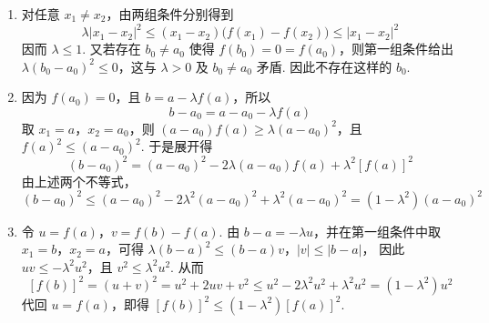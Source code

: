 \begin{solution}
\begin{enumerate}
\item 对任意 \(x_1\ne x_2\)，由两组条件分别得到
\[
\lambda|x_1-x_2|^2\leqslant (x_1-x_2)\bigl(f(x_1)-f(x_2)\bigr)\leqslant |x_1-x_2|^2
\]
因而 \(\lambda\leqslant1\). 又若存在 \(b_0\ne a_0\) 使得 \(f(b_0)=0=f(a_0)\)，则第一组条件给出 \(\lambda(b_0-a_0)^2\leqslant0\)，这与 \(\lambda>0\) 及 \(b_0\ne a_0\) 矛盾. 因此不存在这样的 \(b_0\).

\item 因为 \(f(a_0)=0\)，且 \(b=a-\lambda f(a)\)，所以
\[
b-a_0=a-a_0-\lambda f(a)
\]
取 \(x_1=a\)，\(x_2=a_0\)，则 \((a-a_0)f(a)\geqslant\lambda(a-a_0)^2\)，且 \(f(a)^2\leqslant(a-a_0)^2\). 于是展开得
\[
(b-a_0)^2=(a-a_0)^2-2\lambda(a-a_0)f(a)+\lambda^2[f(a)]^2
\]
由上述两个不等式，
\[
(b-a_0)^2\leqslant(a-a_0)^2-2\lambda^2(a-a_0)^2+\lambda^2(a-a_0)^2=(1-\lambda^2)(a-a_0)^2
\]

\item 令 \(u=f(a)\)，\(v=f(b)-f(a)\). 由 \(b-a=-\lambda u\)，并在第一组条件中取 \(x_1=b\)，\(x_2=a\)，可得
\(\lambda(b-a)^2\leqslant(b-a)v\)，\(|v|\leqslant|b-a|\)，
因此 \(uv\leqslant-\lambda^2u^2\)，且 \(v^2\leqslant\lambda^2u^2\). 从而
\[
[f(b)]^2=(u+v)^2=u^2+2uv+v^2\leqslant u^2-2\lambda^2u^2+\lambda^2u^2=(1-\lambda^2)u^2
\]
代回 \(u=f(a)\)，即得 \([f(b)]^2\leqslant(1-\lambda^2)[f(a)]^2\).
\end{enumerate}
\end{solution}
